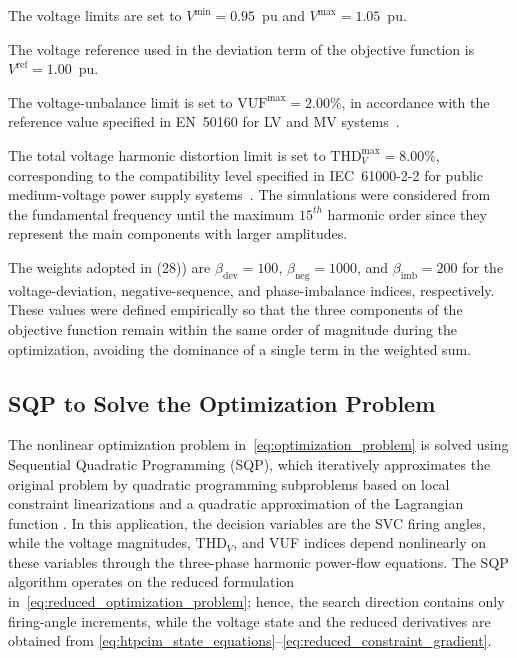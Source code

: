 \documentclass[journal]{IEEEtran}
\begin{document}
The voltage limits are set to
$V^{\min}=0.95$~pu and $V^{\max}=1.05$~pu.

The voltage reference used in the
deviation term of the objective function is $V^{\mathrm{ref}}=1.00$~pu.

The voltage-unbalance limit is set to
$\mathrm{VUF}^{\max}=2.00\%$, in accordance with the reference value specified
in EN~50160 for LV and MV systems~\cite{EN50160}.

The total voltage harmonic
distortion limit is set to $\mathrm{THD}_{V}^{\max}=8.00\%$, corresponding to the
compatibility level specified in IEC~61000-2-2 for public medium-voltage power
supply systems~\cite{IEC61000_2_2}. The simulations were considered from the fundamental frequency until the maximum $15^{th}$ harmonic order since they represent the main components with larger amplitudes.

The
weights adopted in (28)) are
$\beta_{\mathrm{dev}}=100$, $\beta_{\mathrm{neg}}=1000$, and
$\beta_{\mathrm{imb}}=200$ for the voltage-deviation, negative-sequence, and
phase-imbalance indices, respectively. These values were defined
empirically so that the three components of the objective function remain
within the same order of magnitude during the optimization, avoiding the
dominance of a single term in the weighted sum. 




\subsection{SQP to Solve the Optimization Problem}
\label{sec:sqp}

The nonlinear optimization problem in~\eqref{eq:optimization_problem}
is solved using Sequential Quadratic Programming (SQP), which
iteratively approximates the original problem by quadratic
programming subproblems based on local constraint linearizations
and a quadratic approximation of the Lagrangian function
\cite{Gill2005SNOPT}. In this application, the decision variables
are the SVC firing angles, while the voltage magnitudes,
$\mathrm{THD}_V$, and VUF indices depend nonlinearly on these
variables through the three-phase harmonic power-flow equations.
The SQP algorithm operates on the reduced formulation
in~\eqref{eq:reduced_optimization_problem}; hence, the search direction
contains only firing-angle increments, while the voltage state and the
reduced derivatives are obtained from
\eqref{eq:htpcim_state_equations}--\eqref{eq:reduced_constraint_gradient}.
\end{document}
